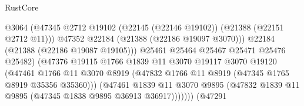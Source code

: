 \begin{lexlean}{RustCore}
\begin{coremodule}
                                                @3064
                                                (@47345
                                                  @2712
                                                  @19102
                                                  (@22145 (@22146 @19102))
                                                  (@21388 (@22151 @2712 @11)))
                                                @47352
                                                @22184
                                                (@21388 (@22186 @19097 @3070)))
                                              @22184
                                              (@21388 (@22186 @19087 @19105)))
                                            @25461
                                            @25464
                                            @25467
                                            @25471
                                            @25476
                                            @25482)
                                          (@47376
                                            @19115
                                            @1766
                                            @1839
                                            @11
                                            @3070
                                            @19117
                                            @3070
                                            @19120
                                            (@47461
                                              @1766
                                              @11
                                              @3070
                                              @8919
                                              (@47832
                                                @1766
                                                @11
                                                @8919
                                                (@47345 @1765 @8919 @35356 @35360)))
                                            (@47461
                                              @1839
                                              @11
                                              @3070
                                              @9895
                                              (@47832
                                                @1839
                                                @11
                                                @9895
                                                (@47345 @1838 @9895 @36913 @36917)))))))
                                    (@47291

\end{coremodule}
\end{lexlean}
